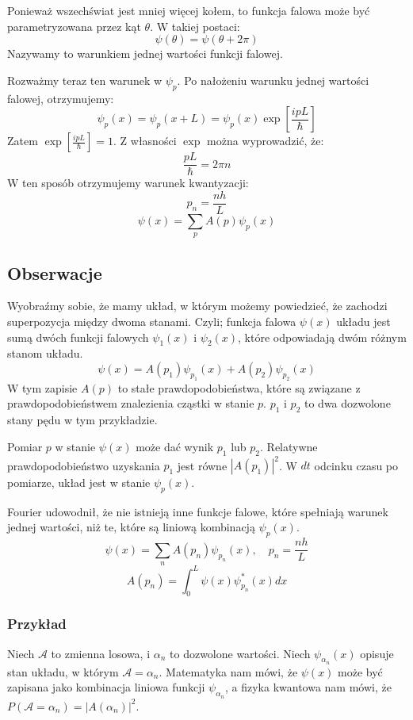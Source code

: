 \documentclass{../notatki}
\begin{document}
Ponieważ wszechświat jest mniej więcej kołem, to funkcja falowa może
być parametryzowana
przez kąt $\theta$. W takiej postaci:
$$
\psi(\theta) = \psi(\theta + 2\pi)
$$
Nazywamy to warunkiem jednej wartości funkcji falowej.

Rozważmy teraz ten warunek w $\psi_p$.
Po nałożeniu warunku jednej wartości falowej, otrzymujemy:
$$
\psi_p(x) = \psi_p(x + L) = \psi_p(x) \exp[\frac{ipL}{\hbar}]
$$
Zatem $\exp[\frac{ipL}{\hbar}] = 1$. Z własności $\exp$ można wyprowadzić, że:
$$
\frac{pL}{\hbar} = 2\pi n
$$
W ten sposób otrzymujemy warunek kwantyzacji:
$$
p_n = \frac{nh}{L}
$$
$$
\psi(x) = \sum_{p} A(p) \psi_p(x)
$$

\subsection{Obserwacje}

Wyobraźmy sobie, że mamy układ, w którym możemy powiedzieć, że zachodzi
superpozycja między dwoma stanami. Czyli; funkcja falowa $\psi(x)$ układu
jest sumą dwóch funkcji falowych $\psi_1(x)$ i $\psi_2(x)$, które odpowiadają
dwóm różnym stanom układu.
$$
\psi(x) = A(p_1)\psi_{p_1}(x) + A(p_2)\psi_{p_2}(x)
$$
W tym zapisie $A(p)$ to stałe prawdopodobieństwa, które są związane z
prawdopodobieństwem znalezienia cząstki w stanie $p$. $p_1$ i $p_2$
to dwa dozwolone stany pędu w tym przykładzie.

Pomiar $p$ w stanie $\psi(x)$ może dać wynik $p_1$ lub $p_2$.
Relatywne prawdopodobieństwo uzyskania $p_1$ jest równe $|A(p_1)|^2$.
W $dt$ odcinku czasu po pomiarze, układ jest w stanie $\psi_p(x)$.

Fourier udowodnił, że nie istnieją inne funkcje falowe, które spełniają
warunek jednej wartości, niż te, które są liniową kombinacją $\psi_p(x)$.
$$
\psi(x) = \sum_{n} A(p_n) \psi_{p_n}(x), \quad p_n = \frac{nh}{L}
$$
$$
A(p_n) = \int_{0}^{L} \psi(x) \psi_{p_n}^*(x) dx
$$

\subsubsection{Przykład}

Niech $\mathcal{A}$ to zmienna losowa, i $\alpha_n$ to dozwolone wartości.
Niech $\psi_{\alpha_n}(x)$ opisuje stan układu, w którym $\mathcal{A} =
\alpha_n$. Matematyka nam mówi, że $\psi(x)$ może być zapisana jako kombinacja
liniowa funkcji $\psi_{\alpha_n}$, a fizyka kwantowa nam mówi, że
$P(\mathcal{A} = \alpha_n) = |A(\alpha_n)|^2$.
\end{document}
